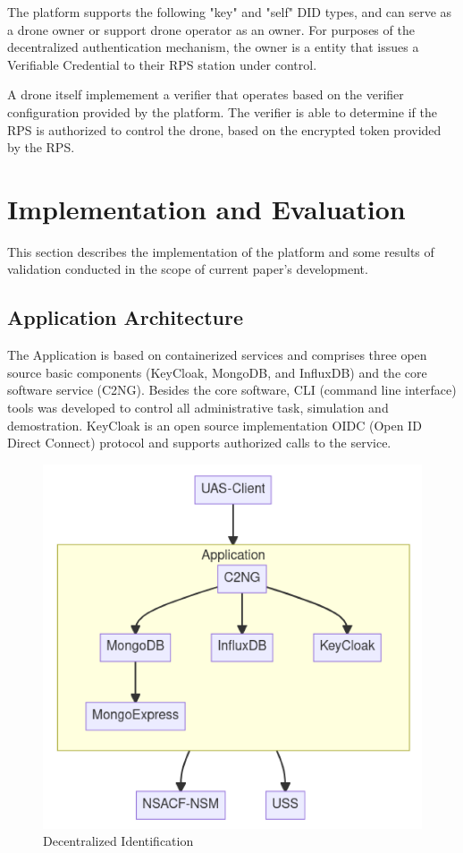 \documentclass[a4paper,conference]{IEEEtran}
\begin{document}
The platform supports the following "key" and "self" DID types, and can serve as a drone owner or support drone operator as an owner. For purposes of the decentralized authentication mechanism, the owner is a entity that issues a Verifiable Credential to their RPS station under control.

A drone itself implemement a verifier that operates based on the verifier configuration provided by the platform. The verifier is able to determine if the RPS is authorized to control the drone, based on the encrypted token provided by the RPS.

\section{Implementation and Evaluation}

This section describes the implementation of the platform and some results of validation conducted in the scope of current paper's development.

\subsection{Application Architecture}

The Application is based on containerized services and comprises three open source basic components (KeyCloak, MongoDB, and InfluxDB) and the core software service (C2NG). Besides the core software, CLI (command line interface) tools was developed to control all administrative task, simulation and demostration. KeyCloak is an open source implementation OIDC (Open ID Direct Connect) protocol and supports authorized calls to the service.

\begin{figure}[!ht]
\centering
\includegraphics[width=0.9\linewidth]{images/arch.png}
\caption{Decentralized Identification}\label{fig:arch}
\end{figure}
\end{document}
